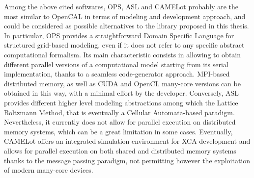 Among the above cited softwares, OPS, ASL and CAMELot probably are
the most similar to OpenCAL in terms of modeling and development
approach, and could be considered as possible alternatives to the
library proposed in this thesis.
In particular, OPS provides a straightforward Domain Specific Language for structured grid-based modeling, even if it does not refer to any specific abstract computational formalism.  
Its main characteristic consists in
allowing to obtain different parallel versions of a computational
model starting from its serial implementation, thanks to a seamless
code-generator approach.  MPI-based distributed memory, as well as
CUDA and OpenCL many-core versions can be obtained in this way, with
a minimal effort by the developer.  Conversely, ASL provides
different higher level modeling abstractions among which the Lattice
Boltzmann Method, that is eventually a Cellular Automata-based
paradigm. Nevertheless, it currently does not allow for parallel
execution on distributed memory systems, which can be a great
limitation in some cases. Eventually, CAMELot offers an integrated
simulation environment for XCA development and allows for parallel
execution on both shared and distributed memory systems thanks to
the message passing paradigm, not permitting however the
exploitation of modern many-core devices.


